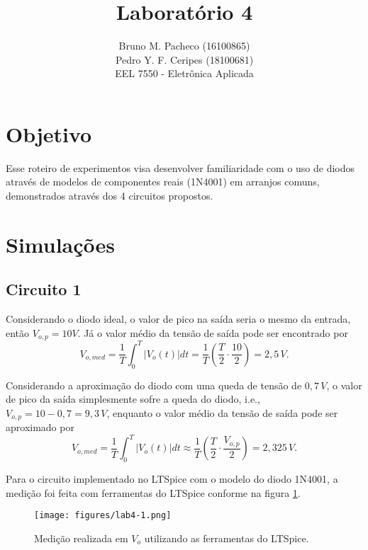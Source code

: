 \documentclass[a4paper]{report}
\begin{document}
 
\title{Laboratório 4}
\author{Bruno M. Pacheco (16100865)\\
Pedro Y. F. Ceripes (18100681) \\
EEL 7550 - Eletrônica Aplicada}
 
\maketitle

\section*{Objetivo}
 
Esse roteiro de experimentos visa desenvolver familiaridade com o uso de diodos através de modelos de componentes reais (1N4001) em arranjos comuns, demonstrados através dos 4 circuitos propostos.
 
\section*{Simulações}

\subsection*{Circuito 1}

Considerando o diodo ideal, o valor de pico na saída seria o mesmo da entrada, então $V_{o,p} = 10 V$. Já o valor médio da tensão de saída pode ser encontrado por \[
V_{o,med} = \frac{1}{T}\int_{0}^{T} \left| V_{o}\left( t \right)  \right| dt = \frac{1}{T}\left( \frac{T}{2}\cdot \frac{10}{2} \right) = 2,5\,V
.\] 

Considerando a aproximação do diodo com uma queda de tensão de $0,7\,V$, o valor de pico da saída simplesmente sofre a queda do diodo, i.e., $V_{o,p} = 10 - 0,7 = 9,3\, V$, enquanto o valor médio da tensão de saída pode ser aproximado por \[
V_{o,med} = \frac{1}{T}\int_{0}^{T} \left| V_{o}\left( t \right)  \right| dt \approx \frac{1}{T}\left( \frac{T}{2}\cdot \frac{V_{o,p}}{2} \right) = 2,325\,V
.\] 

Para o circuito implementado no LTSpice com o modelo do diodo 1N4001, a medição foi feita com ferramentas do LTSpice conforme na figura \ref{fig:figures-lab4-1-png}.

\begin{figure}[H]
    \centering
    \texttt{[image: figures/lab4-1.png]}
    \caption{Medição realizada em $V_o$ utilizando as ferramentas do LTSpice.}
    \label{fig:figures-lab4-1-png}
\end{figure}
\end{document}
